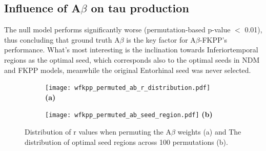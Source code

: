 \subsection{Influence of A$\beta$ on tau production}
The null model performs significantly worse (permutation-based p-value $<$ 0.01), thus concluding that ground truth A$\beta$ is the key factor for A$\beta$-FKPP's performance. What's most interesting is the inclination towards Inferiortemporal regions as the optimal seed, which corresponds also to the optimal seeds in NDM and FKPP models, meanwhile the original Entorhinal seed was never selected.
\begin{figure}[h]
    \centering
    \begin{subfigure}[t]{0.4\linewidth}
        \centering
        \texttt{[image: wfkpp\_permuted\_ab\_r\_distribution.pdf]}
        \vspace{1mm}
        \textbf{(a)}
    \end{subfigure}
    \begin{subfigure}[t]{0.55\linewidth}
        \centering
        \texttt{[image: wfkpp\_permuted\_ab\_seed\_region.pdf]}
        \vspace{1mm}
        \textbf{(b)}
    \end{subfigure}
    \caption{Distribution of r values when permuting the A$\beta$ weights (a) and The distribution of optimal seed regions across 100 permutations (b).}
    \label{fig:null_model_permute_ab}
\end{figure}

